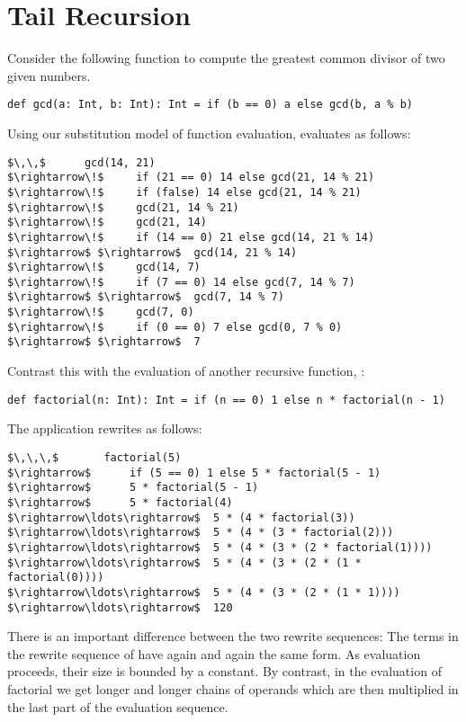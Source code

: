 \section{Tail Recursion}

Consider the following function to compute the greatest common divisor
of two given numbers.

\begin{lstlisting}
def gcd(a: Int, b: Int): Int = if (b == 0) a else gcd(b, a % b)
\end{lstlisting}

Using our substitution model of function evaluation, 
 evaluates as follows:

\begin{lstlisting}
$\,\,$      gcd(14, 21)  
$\rightarrow\!$     if (21 == 0) 14 else gcd(21, 14 % 21)
$\rightarrow\!$     if (false) 14 else gcd(21, 14 % 21)
$\rightarrow\!$     gcd(21, 14 % 21)
$\rightarrow\!$     gcd(21, 14)
$\rightarrow\!$     if (14 == 0) 21 else gcd(14, 21 % 14)
$\rightarrow$ $\rightarrow$  gcd(14, 21 % 14)
$\rightarrow\!$     gcd(14, 7)
$\rightarrow\!$     if (7 == 0) 14 else gcd(7, 14 % 7)
$\rightarrow$ $\rightarrow$  gcd(7, 14 % 7)
$\rightarrow\!$     gcd(7, 0)
$\rightarrow\!$     if (0 == 0) 7 else gcd(0, 7 % 0)
$\rightarrow$ $\rightarrow$  7
\end{lstlisting}

Contrast this with the evaluation of another recursive function, 
:

\begin{lstlisting}
def factorial(n: Int): Int = if (n == 0) 1 else n * factorial(n - 1)
\end{lstlisting}

The application  rewrites as follows:
\begin{lstlisting}
$\,\,\,$       factorial(5)
$\rightarrow$      if (5 == 0) 1 else 5 * factorial(5 - 1)
$\rightarrow$      5 * factorial(5 - 1)
$\rightarrow$      5 * factorial(4)
$\rightarrow\ldots\rightarrow$  5 * (4 * factorial(3))
$\rightarrow\ldots\rightarrow$  5 * (4 * (3 * factorial(2)))
$\rightarrow\ldots\rightarrow$  5 * (4 * (3 * (2 * factorial(1))))
$\rightarrow\ldots\rightarrow$  5 * (4 * (3 * (2 * (1 * factorial(0))))
$\rightarrow\ldots\rightarrow$  5 * (4 * (3 * (2 * (1 * 1))))
$\rightarrow\ldots\rightarrow$  120
\end{lstlisting}
There is an important difference between the two rewrite sequences:
The terms in the rewrite sequence of  have again and again
the same form. As evaluation proceeds, their size is bounded by a
constant. By contrast, in the evaluation of factorial we get longer
and longer chains of operands which are then multiplied in the last
part of the evaluation sequence.

